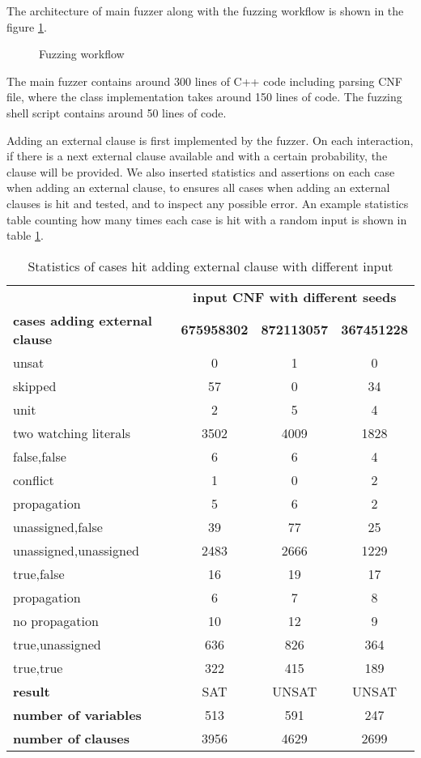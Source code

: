 The architecture of main fuzzer along with the fuzzing workflow is shown in the figure \ref{fig:fuzzer}.

\begin{figure}[h!]
  \centering
  
  \caption{Fuzzing workflow}
  \label{fig:fuzzer}
\end{figure}

The main fuzzer contains around 300 lines of C++ code including parsing CNF file, where the  class implementation takes around 150 lines of code. The fuzzing shell script contains around 50 lines of code.

Adding an external clause is first implemented by the fuzzer. On each interaction, if there is a next external clause available and with a certain probability, the clause will be provided. We also inserted statistics and assertions on each case when adding an external clause, to ensures all cases when adding an external clauses is hit and tested, and to inspect any possible error. An example statistics table counting how many times each case is hit with a random input is shown in table \ref{tab:stats}.

\begin{table}[h!]
  \centering
  \begin{tabular}{|l|c|c|c|}
    \hline
    & \multicolumn{3}{c|}{\textbf{input CNF with different seeds}} \\
    \cline{2-4}
    \textbf{cases adding external clause} & \textbf{675958302} & \textbf{872113057} & \textbf{367451228} \\
    \hline
    unsat & 0 & 1 & 0 \\
    skipped & 57 & 0 & 34 \\
    unit & 2 & 5 & 4 \\
    two watching literals & 3502 & 4009 & 1828 \\
    \quad false,false & 6 & 6 & 4 \\
    \quad\quad conflict & 1 & 0 & 2 \\
    \quad\quad propagation & 5 & 6 & 2 \\
    \quad unassigned,false & 39 & 77 & 25 \\
    \quad unassigned,unassigned & 2483 & 2666 & 1229 \\
    \quad true,false & 16 & 19 & 17 \\
    \quad\quad propagation & 6 & 7 & 8 \\
    \quad\quad no propagation & 10 & 12 & 9 \\
    \quad true,unassigned & 636 & 826 & 364 \\
    \quad true,true & 322 & 415 & 189 \\
    \hline
    \textbf{result} & SAT & UNSAT & UNSAT \\
    \textbf{number of variables} & 513 & 591 & 247 \\
    \textbf{number of clauses} & 3956 & 4629 & 2699 \\
    \hline
  \end{tabular}
  \caption{Statistics of cases hit adding external clause with different input}
  \label{tab:stats}
\end{table}


